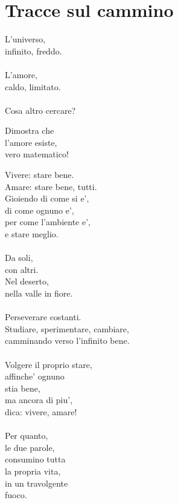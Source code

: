 \chapter{Tracce sul cammino}

\begin{haiku}
L'universo,\\
infinito, freddo.\\
\leavevmode\\
L'amore,\\
caldo, limitato.\\
\leavevmode\\
Cosa altro cercare?\\
\end{haiku}

\begin{haiku}
    Dimostra che\\
    l'amore esiste,\\
    vero matematico!\\
\end{haiku}

\begin{haiku}
    Vivere: stare bene.\\
    Amare: stare bene, tutti.\\
    Gioiendo di come si e',\\
    di come ognuno e',\\
    per come l'ambiente e',\\
    e stare meglio.\\
    \leavevmode\\
    Da soli,\\
    con altri.\\
    Nel deserto,\\
    nella valle in fiore.\\
    \leavevmode\\
    Perseverare costanti.\\
    Studiare, sperimentare, cambiare,\\
    camminando verso l'infinito bene.\\
    \leavevmode\\
    Volgere il proprio stare,\\
    affinche' ognuno\\
    stia bene,\\
    ma ancora di piu',\\
    dica: vivere, amare!\\
    \leavevmode\\
    Per quanto,\\
    le due parole,\\
    consumino tutta \\
    la propria vita,\\
    in un travolgente\\
    fuoco.\\
\end{haiku}

